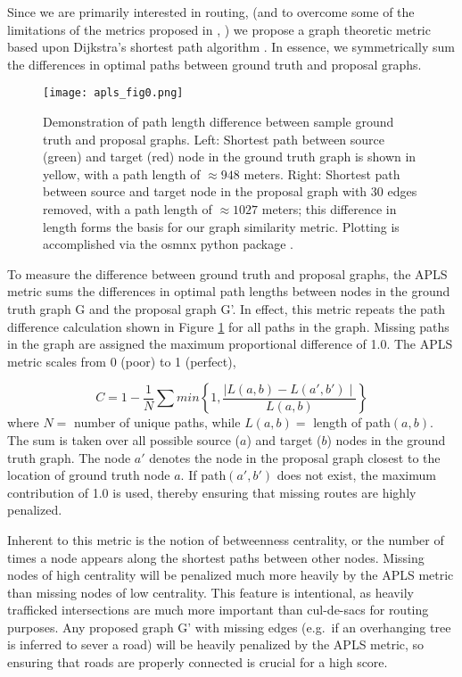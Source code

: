 \documentclass{article}
\begin{document}
Since we are primarily interested in routing, (and to overcome some of the limitations of the metrics proposed in  \cite{topo_metric},  \cite{5perc_metric}) we propose a graph theoretic metric based upon Dijkstra's shortest path algorithm \cite{Dijkstra1959}. In essence, we symmetrically sum the differences in optimal paths between ground truth and proposal graphs. 


\begin{figure}
  \centering
     \texttt{[image: apls\_fig0.png]}
  \caption{Demonstration of path length difference between sample ground truth and proposal graphs. Left: Shortest path between source (green) and target (red) node in the ground truth graph is shown in yellow, with a path length of $\approx948$ meters. Right: Shortest path between source and target node in the proposal graph with 30 edges removed, with a path length of $\approx1027$ meters; this difference in length forms the basis for our graph similarity metric. Plotting is accomplished via the osmnx python package \cite{osmnx}.}
  \label{fig:apls_fig0}
\end{figure}


To measure the difference between ground truth and proposal graphs,
the APLS metric sums the differences in optimal path lengths between nodes in the ground truth graph G and the proposal graph G'. In effect, this metric repeats the path difference calculation shown in Figure \ref{fig:apls_fig0} for all paths in the graph. Missing paths in the graph are assigned the maximum proportional difference of 1.0. The APLS metric scales from 0 (poor) to 1 (perfect),

\begin{equation}
\label{eqn:apls}
C = 1 - \frac{1}{N} \sum min \left\{ 1, \frac{ \mid L(a,b) - L(a',b') \mid }{ L(a,b) }  \right\}
\end{equation}
where $N = $ number of unique paths, while $L(a,b) =$ length of path$(a,b)$.  The sum is taken over all possible source ($a$) and target ($b$) nodes in the ground truth graph.  The node $a'$ denotes the node in the proposal graph closest to the location of ground truth node $a$.  If path$(a',b')$ does not exist, the maximum contribution of 1.0 is used, thereby ensuring that missing routes are highly penalized. 



Inherent to this metric is the notion of betweenness centrality, or the number of times a node appears along the shortest paths between other nodes. Missing nodes of high centrality will be penalized much more heavily by the APLS metric than missing nodes of low centrality. This feature is intentional, as heavily trafficked intersections are much more important than cul-de-sacs for routing purposes. Any proposed graph G' with missing edges (e.g.~if an overhanging tree is inferred to sever a road) will be heavily penalized by the APLS metric, so ensuring that roads are properly connected is crucial for a high score. 
\end{document}
